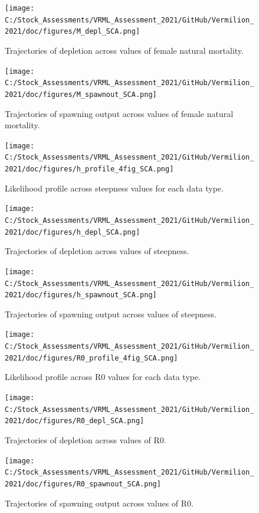 \documentclass[11pt,
  english,
  a4paper,
]{article}
\begin{document}
\begin{figure}
\centering
\texttt{[image: C:/Stock\_Assessments/VRML\_Assessment\_2021/GitHub/Vermilion\_2021/doc/figures/M\_depl\_SCA.png]}
\caption{Trajectories of depletion across values of female natural mortality.\label{fig:m-depl}}
\end{figure}

\begin{figure}
\centering
\texttt{[image: C:/Stock\_Assessments/VRML\_Assessment\_2021/GitHub/Vermilion\_2021/doc/figures/M\_spawnout\_SCA.png]}
\caption{Trajectories of spawning output across values of female natural mortality.\label{fig:m-spawn}}
\end{figure}

\begin{figure}
\centering
\texttt{[image: C:/Stock\_Assessments/VRML\_Assessment\_2021/GitHub/Vermilion\_2021/doc/figures/h\_profile\_4fig\_SCA.png]}
\caption{Likelihood profile across steepness values for each data type.\label{fig:h-profile}}
\end{figure}

\begin{figure}
\centering
\texttt{[image: C:/Stock\_Assessments/VRML\_Assessment\_2021/GitHub/Vermilion\_2021/doc/figures/h\_depl\_SCA.png]}
\caption{Trajectories of depletion across values of steepness.\label{fig:h-depl}}
\end{figure}

\begin{figure}
\centering
\texttt{[image: C:/Stock\_Assessments/VRML\_Assessment\_2021/GitHub/Vermilion\_2021/doc/figures/h\_spawnout\_SCA.png]}
\caption{Trajectories of spawning output across values of steepness.\label{fig:h-spawn}}
\end{figure}

\begin{figure}
\centering
\texttt{[image: C:/Stock\_Assessments/VRML\_Assessment\_2021/GitHub/Vermilion\_2021/doc/figures/R0\_profile\_4fig\_SCA.png]}
\caption{Likelihood profile across R0 values for each data type.\label{fig:r0-profile}}
\end{figure}

\begin{figure}
\centering
\texttt{[image: C:/Stock\_Assessments/VRML\_Assessment\_2021/GitHub/Vermilion\_2021/doc/figures/R0\_depl\_SCA.png]}
\caption{Trajectories of depletion across values of R0.\label{fig:r0-depl}}
\end{figure}

\begin{figure}
\centering
\texttt{[image: C:/Stock\_Assessments/VRML\_Assessment\_2021/GitHub/Vermilion\_2021/doc/figures/R0\_spawnout\_SCA.png]}
\caption{Trajectories of spawning output across values of R0.\label{fig:r0-spawn}}
\end{figure}
\end{document}
